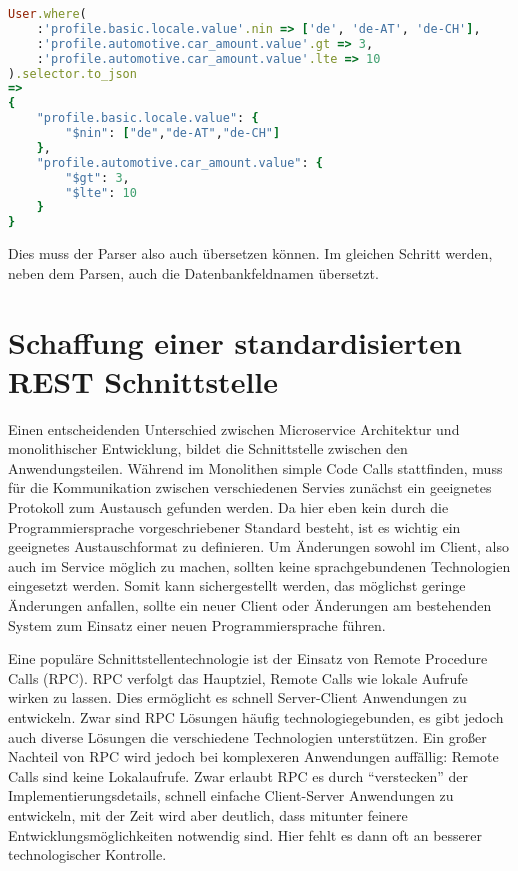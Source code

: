 \begin{lstlisting}[language=Ruby]
User.where(
    :'profile.basic.locale.value'.nin => ['de', 'de-AT', 'de-CH'],
    :'profile.automotive.car_amount.value'.gt => 3,
    :'profile.automotive.car_amount.value'.lte => 10
).selector.to_json
=> 
{
    "profile.basic.locale.value": {
        "$nin": ["de","de-AT","de-CH"]
    },
    "profile.automotive.car_amount.value": {
        "$gt": 3,
        "$lte": 10
    }
}
\end{lstlisting}

\noindent Dies muss der Parser also auch übersetzen können. Im gleichen Schritt werden, neben dem Parsen, auch die Datenbankfeldnamen übersetzt.

\section{Schaffung einer standardisierten REST Schnittstelle}
Einen entscheidenden Unterschied zwischen Microservice Architektur und monolithischer Entwicklung, bildet die Schnittstelle zwischen den Anwendungsteilen. Während im Monolithen simple Code Calls stattfinden, muss für die Kommunikation zwischen verschiedenen Servies zunächst ein geeignetes Protokoll zum Austausch gefunden werden.
Da hier eben kein durch die Programmiersprache vorgeschriebener Standard besteht, ist es wichtig ein geeignetes Austauschformat zu definieren.
Um Änderungen sowohl im Client, also auch im Service möglich zu machen, sollten keine sprachgebundenen Technologien eingesetzt werden. Somit kann sichergestellt werden, das möglichst geringe Änderungen anfallen, sollte ein neuer Client oder Änderungen am bestehenden System zum Einsatz einer neuen Programmiersprache führen.

Eine populäre Schnittstellentechnologie ist der Einsatz von Remote Procedure Calls (RPC)\cite{rpc}. RPC verfolgt das Hauptziel, Remote Calls wie lokale Aufrufe wirken zu lassen. Dies ermöglicht es schnell Server-Client Anwendungen zu entwickeln. Zwar sind RPC Lösungen häufig technologiegebunden\cite[vgl.][Seite 46]{newman2015building}, es gibt jedoch auch diverse Lösungen die verschiedene Technologien unterstützen. Ein großer Nachteil von RPC wird jedoch bei komplexeren Anwendungen auffällig: Remote Calls sind keine Lokalaufrufe.\cite[][Seite 47]{newman2015building} Zwar erlaubt RPC es durch ``verstecken'' der Implementierungsdetails, schnell einfache Client-Server Anwendungen zu entwickeln, mit der Zeit wird aber deutlich, dass mitunter feinere Entwicklungsmöglichkeiten notwendig sind. Hier fehlt es dann oft an besserer technologischer Kontrolle.

